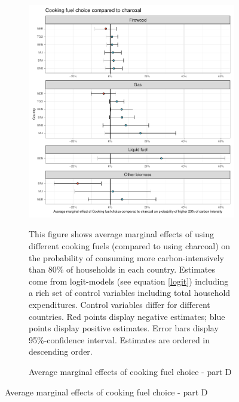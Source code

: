  \begin{figure}[ht!]\ContinuedFloat
   \centering
   \begin{subfigure}[b]{\textwidth}
   \centering
   \caption{Average marginal effects of cooking fuel choice - part D} \label{fig:Logit_ME_CF_4}
   \includegraphics{1_Figures/Analysis_Logit_Models_Marginal_Effects/Average_Marginal_Effects_affected_upper_80_CF_Charcoal_2017B.pdf}
   \begin{subcaption2}
     This figure shows average marginal effects of using different cooking fuels (compared to using charcoal) on the probability of consuming more carbon-intensively than 80\% of households in each country. Estimates come from logit-models (see equation \ref{logit}) including a rich set of control variables including total household expenditures. Control variables differ for different countries. Red points display negative estimates; blue points display positive estimates. Error bars display 95\%-confidence interval. Estimates are ordered in descending order.
   \end{subcaption2}
   \end{subfigure}
 \end{figure}
 \clearpage
